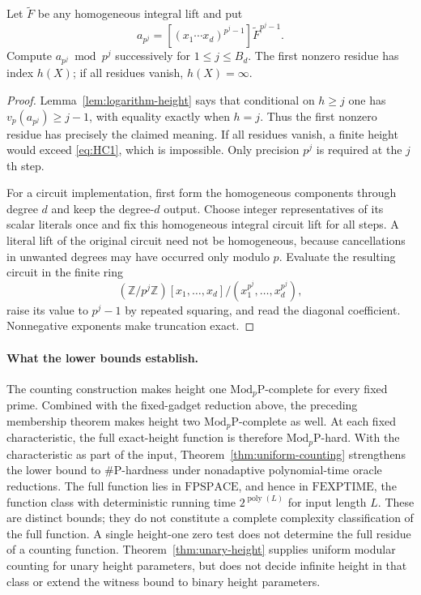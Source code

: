 \begin{proposition}
Let $\widetilde F$ be any homogeneous integral lift and put
\[
 a_{p^j}=[(x_1\cdots x_d)^{p^j-1}]\widetilde F^{p^j-1}.
\]
Compute $a_{p^j}\bmod p^j$ successively for $1\le j\le B_d$.
The first nonzero residue has index $h(X)$; if all residues vanish,
$h(X)=\infty$.
\end{proposition}
\begin{proof}
Lemma~\ref{lem:logarithm-height}
says that conditional on $h\ge j$ one has
$v_p(a_{p^j})\ge j-1$, with equality exactly when $h=j$.
Thus the first nonzero residue has precisely the claimed meaning.
If all residues vanish, a finite height would exceed \eqref{eq:HC1}, which is
impossible.  Only precision $p^j$ is required at the $j$th step.

For a circuit implementation, first form the homogeneous components
through degree $d$ and keep the degree-$d$ output. Choose integer
representatives of its scalar literals once and fix this homogeneous
integral circuit lift for all steps. A literal lift of the original
circuit need not be homogeneous, because cancellations in unwanted
degrees may have occurred only modulo $p$.
Evaluate the resulting circuit in the finite ring
\[
 (\mathbb Z/p^j\mathbb Z)[x_1,\ldots,x_d]/
 (x_1^{p^j},\ldots,x_d^{p^j}),
\]
raise its value to $p^j-1$ by repeated squaring, and read the diagonal
coefficient. Nonnegative exponents make truncation exact.
\end{proof}







\paragraph{What the lower bounds establish.}
The counting construction makes height one
$\mathrm{Mod}_p\mathrm P$-complete for every fixed prime.  Combined
with the fixed-gadget reduction above, the preceding
membership theorem makes height two $\mathrm{Mod}_p\mathrm P$-complete
as well.  At each fixed characteristic, the full exact-height function is therefore
$\mathrm{Mod}_p\mathrm P$-hard. With the characteristic as part of the
input, Theorem~\ref{thm:uniform-counting} strengthens the lower bound
to $\#\mathrm P$-hardness under nonadaptive polynomial-time oracle
reductions. The full function lies in $\mathrm{FPSPACE}$, and hence in
$\mathrm{FEXPTIME}$, the function class with deterministic running time
$2^{\operatorname{poly}(L)}$ for input length $L$.
These are distinct bounds; they do not constitute a complete complexity
classification of the full function. A single height-one zero test
does not determine the full residue of a counting function.
Theorem~\ref{thm:unary-height} supplies uniform modular counting for
unary height parameters, but does not decide infinite height in that
class or extend the witness bound to binary height parameters.
